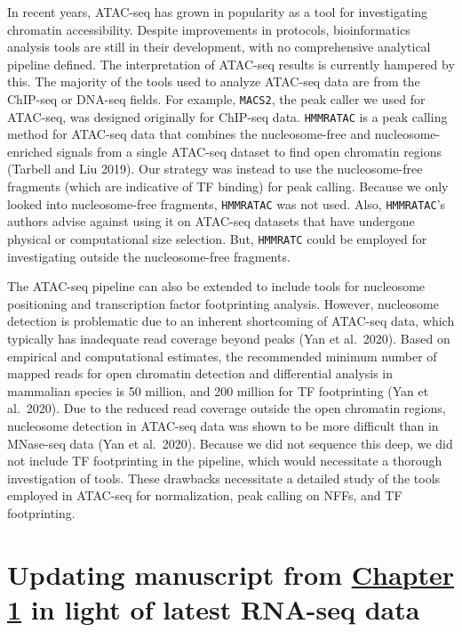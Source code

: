 \documentclass[12pt,twoside]{reedthesis}
\begin{document}
In recent years, ATAC-seq has grown in popularity as a tool for investigating chromatin accessibility. Despite improvements in protocols, bioinformatics analysis tools are still in their development, with no comprehensive analytical pipeline defined. The interpretation of ATAC-seq results is currently hampered by this. The majority of the tools used to analyze ATAC-seq data are from the ChIP-seq or DNA-seq fields. For example, \texttt{MACS2}, the peak caller we used for ATAC-seq, was designed originally for ChIP-seq data. \texttt{HMMRATAC} is a peak calling method for ATAC-seq data that combines the nucleosome-free and nucleosome-enriched signals from a single ATAC-seq dataset to find open chromatin regions (Tarbell and Liu 2019). Our strategy was instead to use the nucleosome-free fragments (which are indicative of TF binding) for peak calling. Because we only looked into nucleosome-free fragments, \texttt{HMMRATAC} was not used. Also, \texttt{HMMRATAC}'s authors advise against using it on ATAC-seq datasets that have undergone physical or computational size selection. But, \texttt{HMMRATC} could be employed for investigating outside the nucleosome-free fragments.

The ATAC-seq pipeline can also be extended to include tools for nucleosome positioning and transcription factor footprinting analysis. However, nucleosome detection is problematic due to an inherent shortcoming of ATAC-seq data, which typically has inadequate read coverage beyond peaks (Yan et al.~2020). Based on empirical and computational estimates, the recommended minimum number of mapped reads for open chromatin detection and differential analysis in mammalian species is 50 million, and 200 million for TF footprinting (Yan et al.~2020). Due to the reduced read coverage outside the open chromatin regions, nucleosome detection in ATAC-seq data was shown to be more difficult than in MNase-seq data (Yan et al.~2020). Because we did not sequence this deep, we did not include TF footprinting in the pipeline, which would necessitate a thorough investigation of tools. These drawbacks necessitate a detailed study of the tools employed in ATAC-seq for normalization, peak calling on NFFs, and TF footprinting.

\hypertarget{updating-manuscript-from-chapter-1-in-light-of-latest-rna-seq-data}{%
\section*{\texorpdfstring{Updating manuscript from \protect\hyperlink{chapter1}{Chapter 1} in light of latest RNA-seq data}{Updating manuscript from Chapter 1 in light of latest RNA-seq data}}\label{updating-manuscript-from-chapter-1-in-light-of-latest-rna-seq-data}}
\end{document}
